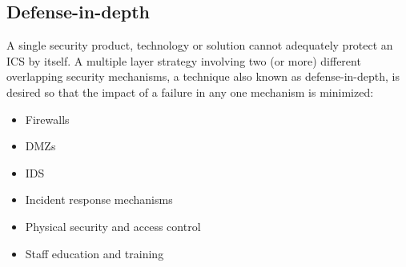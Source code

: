 \subsection{Defense-in-depth}
A single security product, technology or solution cannot adequately protect an ICS
by itself. 
A multiple layer strategy involving two (or more) different overlapping security
mechanisms, a technique also known as defense-in-depth, is desired so that the
impact of a failure in any one mechanism is minimized:
\begin{itemize}
	\item Firewalls
	\item DMZs
	\item IDS
	\item Incident response mechanisms
	\item Physical security and access control
	\item Staff education and training
\end{itemize}

